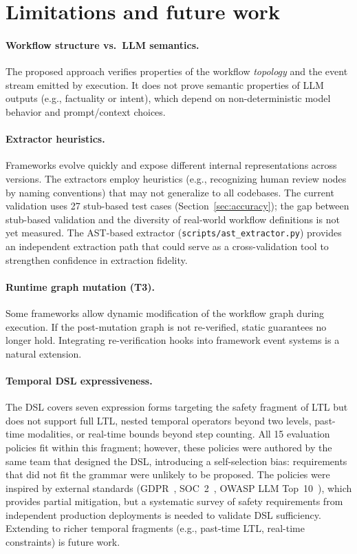 \section{Limitations and future work}
\label{sec:limitations}

\paragraph{Workflow structure vs.\ LLM semantics.}
The proposed approach verifies properties of the workflow \emph{topology} and
the event stream emitted by execution. It does not prove semantic
properties of LLM outputs (e.g., factuality or intent), which depend
on non-deterministic model behavior and prompt/context choices.

\paragraph{Extractor heuristics.}
Frameworks evolve quickly and expose different internal representations
across versions. The extractors employ heuristics (e.g., recognizing
human review nodes by naming conventions) that may not generalize to
all codebases. The current validation uses 27 stub-based test cases
(Section~\ref{sec:accuracy}); the gap between stub-based validation and
the diversity of real-world workflow definitions is not yet measured.
The AST-based extractor (\texttt{scripts/\allowbreak ast\_extractor.py})
provides an independent extraction path that could serve as a
cross-validation tool to strengthen confidence in extraction fidelity.

\paragraph{Runtime graph mutation (T3).}
Some frameworks allow dynamic modification of the workflow graph during
execution. If the post-mutation graph is not re-verified, static
guarantees no longer hold. Integrating re-verification hooks into
framework event systems is a natural extension.

\paragraph{Temporal DSL expressiveness.}
The DSL covers seven expression forms targeting the safety fragment of
LTL but does not support full LTL, nested temporal operators beyond
two levels, past-time modalities, or real-time bounds beyond step
counting. All 15 evaluation policies fit within this fragment; however,
these policies were authored by the same team that designed the DSL,
introducing a self-selection bias: requirements that did not fit the
grammar were unlikely to be proposed. The policies were inspired by
external standards (GDPR~\citep{gdpr_article22},
SOC~2~\citep{aicpa_soc2}, OWASP LLM Top~10~\citep{owasp_llm_top10}),
which provides partial mitigation, but a systematic survey of safety
requirements from independent production deployments is needed to
validate DSL sufficiency. Extending to richer temporal fragments
(e.g., past-time LTL, real-time constraints) is future work.

